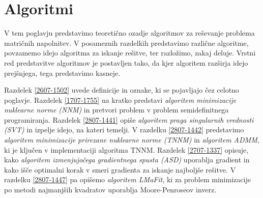 \chapter{Algoritmi} \label{1407-1011}

V tem poglavju predstavimo teoretično ozadje algoritmov za reševanje problema matričnih napolnitev. V posameznih razdelkih predstavimo različne algoritme, povzamemo idejo algoritma za iskanje rešitve, ter razložimo, zakaj deluje. Vrstni red predstavitve algoritmov je postavljen tako, da kjer algoritem razširja idejo prejšnjega, tega predstavimo kasneje.

Razdelek \ref{2607-1502} uvede definicije in oznake, ki se pojavljajo čez celotno poglavje. Razdelek \ref{1707-1755} na kratko predstavi \textit{algoritem minimizacije nuklearne norme (NNM)} in pretvori problem v problem semidefinitnega programiranja.
Razdelek \ref{2807-1441} opiše \textit{algoritem praga singularnih vrednosti (SVT)} in izpelje idejo, na kateri temelji. 
V razdelku \ref{2807-1442} predstavimo \textit{algoritem minimizacije prirezane nuklearne norme (TNNM)} in \textit{algoritem ADMM}, ki je ključen v implementaciji algoritma TNNM.
Razdelek \ref{2707-1337} opisuje, kako \textit{algoritem izmenjujočega gradientnega spusta (ASD)} uporablja gradient in kako išče optimalni korak v smeri gradienta za iskanje najboljše rešitve.
V razdelku \ref{2807-1447} pa opišemo \textit{algoritem LMaFit}, ki za problem minimizacije po metodi najmanjših kvadratov uporablja Moore-Penroseov inverz. 

